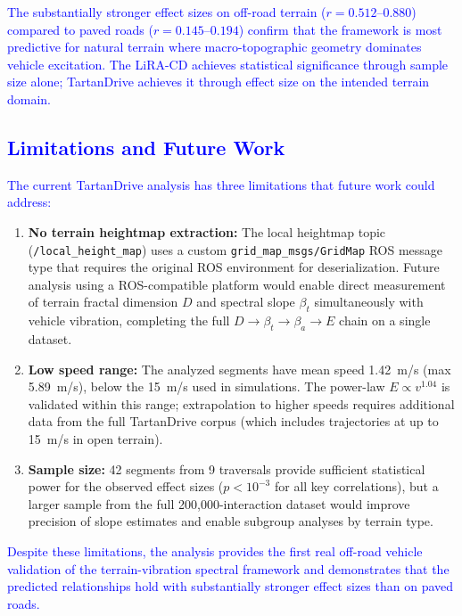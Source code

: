 \documentclass[11pt]{article}
\begin{document}
\textcolor{blue}{The substantially stronger effect sizes on off-road terrain ($r = 0.512$--$0.880$) compared to paved roads ($r = 0.145$--$0.194$) confirm that the framework is most predictive for natural terrain where macro-topographic geometry dominates vehicle excitation. The LiRA-CD achieves statistical significance through sample size alone; TartanDrive achieves it through effect size on the intended terrain domain.}

\textcolor{blue}{\subsection{Limitations and Future Work}}

\textcolor{blue}{The current TartanDrive analysis has three limitations that future work could address:}

{\color{blue}
\begin{enumerate}
\item \textbf{No terrain heightmap extraction:} The local heightmap topic (\texttt{/local\_height\_map}) uses a custom \texttt{grid\_map\_msgs/GridMap} ROS message type that requires the original ROS environment for deserialization. Future analysis using a ROS-compatible platform would enable direct measurement of terrain fractal dimension $D$ and spectral slope $\beta_t$ simultaneously with vehicle vibration, completing the full $D \rightarrow \beta_t \rightarrow \beta_a \rightarrow E$ chain on a single dataset.

\item \textbf{Low speed range:} The analyzed segments have mean speed 1.42~m/s (max 5.89~m/s), below the 15~m/s used in simulations. The power-law $E \propto v^{1.04}$ is validated within this range; extrapolation to higher speeds requires additional data from the full TartanDrive corpus (which includes trajectories at up to 15~m/s in open terrain).

\item \textbf{Sample size:} 42 segments from 9 traversals provide sufficient statistical power for the observed effect sizes ($p < 10^{-3}$ for all key correlations), but a larger sample from the full 200,000-interaction dataset would improve precision of slope estimates and enable subgroup analyses by terrain type.
\end{enumerate}
}

\textcolor{blue}{Despite these limitations, the analysis provides the first real off-road vehicle validation of the terrain-vibration spectral framework and demonstrates that the predicted relationships hold with substantially stronger effect sizes than on paved roads.}
\end{document}

